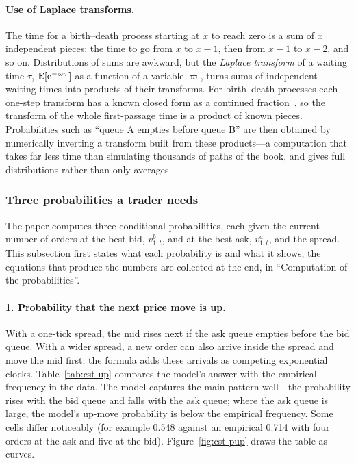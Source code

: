 \paragraph{Use of Laplace transforms.} The time for a birth--death process starting at $x$ to reach zero is
a sum of $x$ independent pieces: the time to go from $x$ to $x-1$, then from $x-1$ to $x-2$, and so on.
Distributions of sums are awkward, but the \emph{Laplace transform} of a waiting time $\tau$,
$\mathbb{E}[\mathrm{e}^{-\varpi \tau}]$ as a function of a variable $\varpi$, turns sums of independent waiting
times into products of their transforms. For birth--death processes each one-step transform has a known
closed form as a continued fraction~\citep{cst2010}, so the transform of the whole first-passage time is a
product of known pieces. Probabilities such as ``queue A empties before queue B'' are then obtained by
numerically inverting a transform built from these products---a computation that takes far less time than
simulating thousands of paths of the book, and gives full distributions rather than only averages.

\subsubsection{Three probabilities a trader needs}

The paper computes three conditional probabilities, each given the current number of orders at the
best bid, $v^b_{1,t}$, and at the best ask, $v^a_{1,t}$, and the spread. This subsection first states
what each probability is and what it shows; the equations that produce the numbers are collected at the
end, in ``Computation of the probabilities''.

\paragraph{1. Probability that the next price move is up.} With a one-tick spread, the mid rises next if the ask
queue empties before the bid queue. With a wider spread, a new order can also arrive inside the spread
and move the mid first; the formula adds these arrivals as competing exponential clocks.
Table~\ref{tab:cst-up} compares the model's answer with the empirical frequency in the data. The model
captures the main pattern well---the probability rises with the bid queue and falls with the ask
queue; where the ask queue is large, the model's up-move probability is below the empirical
frequency. Some cells differ
noticeably (for example 0.548 against an empirical 0.714 with four orders at the ask and five at the
bid). Figure~\ref{fig:cst-pup} draws the table as curves.

